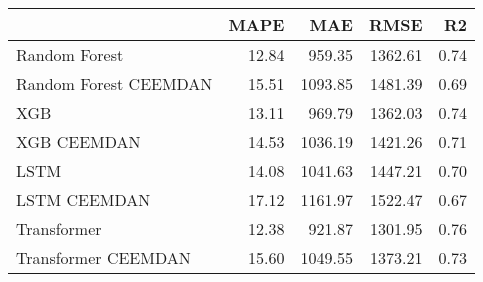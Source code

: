 \begin{tabular}{lrrrr}
\toprule
{} &  MAPE &     MAE &    RMSE &   R2 \\
\midrule
Random Forest         & 12.84 &  959.35 & 1362.61 & 0.74 \\
Random Forest CEEMDAN & 15.51 & 1093.85 & 1481.39 & 0.69 \\
XGB                   & 13.11 &  969.79 & 1362.03 & 0.74 \\
XGB CEEMDAN           & 14.53 & 1036.19 & 1421.26 & 0.71 \\
LSTM                  & 14.08 & 1041.63 & 1447.21 & 0.70 \\
LSTM CEEMDAN          & 17.12 & 1161.97 & 1522.47 & 0.67 \\
Transformer           & 12.38 &  921.87 & 1301.95 & 0.76 \\
Transformer CEEMDAN   & 15.60 & 1049.55 & 1373.21 & 0.73 \\
\bottomrule
\end{tabular}
